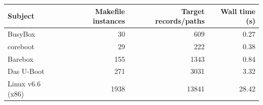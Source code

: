 \begin{tabular}{lrrr}
\toprule
Subject & Makefile instances & Target records/paths & Wall time (s) \\
\midrule
BusyBox & 30 & 609 & 0.27 \\
coreboot & 29 & 222 & 0.38 \\
Barebox & 155 & 1343 & 0.84 \\
Das U-Boot & 271 & 3031 & 3.32 \\
Linux v6.6 (x86) & 1938 & 13841 & 28.42 \\
\bottomrule
\end{tabular}
